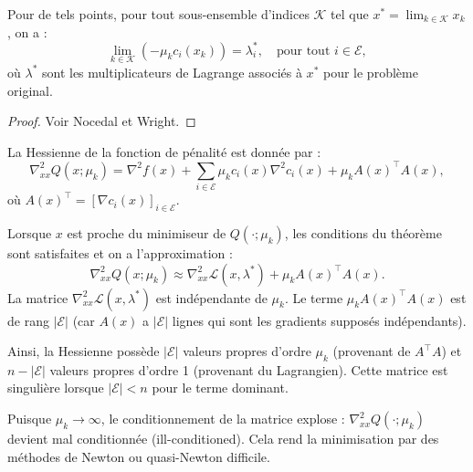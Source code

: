 \begin{remarque}
    Pour de tels points, pour tout sous-ensemble d'indices $\mathcal{K}$ tel que $x^* = \lim_{k \in \mathcal{K}} x_k$, on a :
    \[
        \lim_{k \in \mathcal{K}} (-\mu_k c_i(x_k)) = \lambda_i^*, \quad \text{pour tout } i \in \mathcal{E},
    \]
    où $\lambda^*$ sont les multiplicateurs de Lagrange associés à $x^*$ pour le problème original.
    \begin{proof}
        Voir Nocedal et Wright.
    \end{proof}
\end{remarque}

\begin{remarque}
    La Hessienne de la fonction de pénalité est donnée par :
    \[
        \nabla_{xx}^2 Q(x; \mu_k) = \nabla^2 f(x) + \sum_{i \in \mathcal{E}} \mu_k c_i(x) \nabla^2 c_i(x) + \mu_k A(x)^\top A(x),
    \]
    où $A(x)^\top = [\nabla c_i(x)]_{i \in \mathcal{E}}$.
    
    Lorsque $x$ est proche du minimiseur de $Q(\cdot; \mu_k)$, les conditions du théorème sont satisfaites et on a l'approximation :
    \[
        \nabla_{xx}^2 Q(x; \mu_k) \approx \nabla_{xx}^2 \mathcal{L}(x, \lambda^*) + \mu_k A(x)^\top A(x).
    \]
    La matrice $\nabla_{xx}^2 \mathcal{L}(x, \lambda^*)$ est indépendante de $\mu_k$.
    Le terme $\mu_k A(x)^\top A(x)$ est de rang $|\mathcal{E}|$ (car $A(x)$ a $|\mathcal{E}|$ lignes qui sont les gradients supposés indépendants).
    
    Ainsi, la Hessienne possède $|\mathcal{E}|$ valeurs propres d'ordre $\mu_k$ (provenant de $A^\top A$) et $n - |\mathcal{E}|$ valeurs propres d'ordre 1 (provenant du Lagrangien).
    Cette matrice est singulière lorsque $|\mathcal{E}| < n$ pour le terme dominant.
    
    Puisque $\mu_k \to \infty$, le conditionnement de la matrice explose : $\nabla_{xx}^2 Q(\cdot; \mu_k)$ devient mal conditionnée (ill-conditioned). Cela rend la minimisation par des méthodes de Newton ou quasi-Newton difficile.
\end{remarque}

